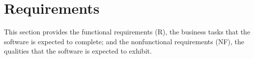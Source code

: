 \section{Requirements}\label{sec_Reqs}

This section provides the functional requirements (R), the business tasks that
the software is expected to complete; and the nonfunctional requirements (NF),
the qualities that the software is expected to exhibit.



\clearpage

